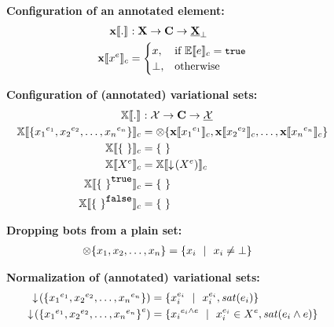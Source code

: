 \begin{figure}
%
\textbf{Configuration of an annotated element:}
\begin{alignat*}{1}
\xeSem [] . &: \elemSet \to \confSet \to \maybe \pelemSet\\
\xeSem {\annot \elem} &=
  \begin{cases}
    \elem, & \If \fSem {\dimMeta} = \t\\
    \bot, &\Otherwise    
  \end{cases}
\end{alignat*}

\medskip
\textbf{Configuration of (annotated) variational sets:}
\begin{alignat*}{1}
\osetSem [] . &: \vsetSet \to \confSet \to \psetSet\\
\osetSem {\setDef{\annot [\dimMeta_1] {\elem_1}, \annot [\dimMeta_2] {\elem_2}, \ldots, \annot [\dimMeta_n] {\elem_n}}} &= \dropbot {\setDef{\xeSem {\annot [\dimMeta_1] {\elem_1}}, 
\xeSem {\annot [\dimMeta_2] {\elem_2}}, \ldots, \xeSem {\annot [\dimMeta_n] {\elem_n}} }}\\
\osetSem {\setDef \ } &= \setDef \ \\
%
\osetSem {\annot {\vset}} &= \osetSem {\pushIn {\annot \vset}}\\
\osetSem {\annot [\t] {\setDef \ }} & = \setDef \ \\
\osetSem {\annot [\f] {\setDef \ }} & = \setDef \ 
\end{alignat*}

\medskip
\textbf{Dropping bots from a plain set:}
\begin{alignat*}{1}
\dropbot {\setDef {\elem_1, \elem_2, \ldots, \elem_n}} &= \setDef {\elem_i \myOR \elem_i \neq \bot}
\end{alignat*}

\medskip 
\textbf{Normalization of (annotated) variational sets:}
\begin{alignat*}{1}
\pushIn {\setDef {\annot [\dimMeta_1] {\elem_1}, \annot [\dimMeta_2] {\elem_2}, \ldots,
\annot [\dimMeta_n] {\elem_n}}} &= \setDef {
\annot [\dimMeta_i] \elem_i \myOR \annot [\dimMeta_i] \elem_i, \sat {\dimMeta_i}}\\
\pushIn {\annot {\setDef {\annot [\dimMeta_1] {\elem_1}, \annot [\dimMeta_2] {\elem_2}, \ldots,
\annot [\dimMeta_n] {\elem_n}}}} &= 
\setDef {\annot [\dimMeta_i \wedge \dimMeta] {\elem_i} \myOR 
\annot [\dimMeta_i] \elem_i \in \annot \vset, \sat {\dimMeta_i \wedge \dimMeta}}
\end{alignat*}


\end{figure}
